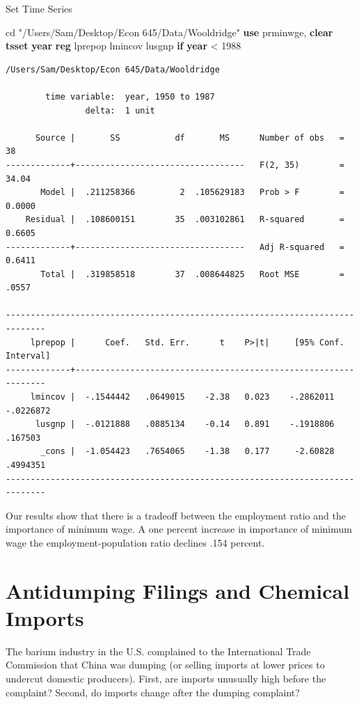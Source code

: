 \documentclass[
]{book}
\newenvironment{Shaded}{\begin{snugshade}}{\end{snugshade}}
\newcommand{\FunctionTok}[1]{\textcolor[rgb]{0.13,0.29,0.53}{\textbf{#1}}}
\newcommand{\KeywordTok}[1]{\textcolor[rgb]{0.13,0.29,0.53}{\textbf{#1}}}
\newcommand{\NormalTok}[1]{#1}
\newcommand{\StringTok}[1]{\textcolor[rgb]{0.31,0.60,0.02}{#1}}
\begin{document}
Set Time Series

\begin{Shaded}
\begin{Highlighting}[]
\NormalTok{cd }\StringTok{"/Users/Sam/Desktop/Econ 645/Data/Wooldridge"}
\KeywordTok{use}\NormalTok{ prminwge, }\KeywordTok{clear}
\KeywordTok{tsset} \FunctionTok{year}
\KeywordTok{reg}\NormalTok{ lprepop lmincov lusgnp }\KeywordTok{if} \FunctionTok{year}\NormalTok{ \textless{} 1988}
\end{Highlighting}
\end{Shaded}

\begin{verbatim}
/Users/Sam/Desktop/Econ 645/Data/Wooldridge

        time variable:  year, 1950 to 1987
                delta:  1 unit

      Source |       SS           df       MS      Number of obs   =        38
-------------+----------------------------------   F(2, 35)        =     34.04
       Model |  .211258366         2  .105629183   Prob > F        =    0.0000
    Residual |  .108600151        35  .003102861   R-squared       =    0.6605
-------------+----------------------------------   Adj R-squared   =    0.6411
       Total |  .319858518        37  .008644825   Root MSE        =     .0557

------------------------------------------------------------------------------
     lprepop |      Coef.   Std. Err.      t    P>|t|     [95% Conf. Interval]
-------------+----------------------------------------------------------------
     lmincov |  -.1544442   .0649015    -2.38   0.023    -.2862011   -.0226872
      lusgnp |  -.0121888   .0885134    -0.14   0.891    -.1918806     .167503
       _cons |  -1.054423   .7654065    -1.38   0.177     -2.60828    .4994351
------------------------------------------------------------------------------
\end{verbatim}

Our results show that there is a tradeoff between the employment ratio and
the importance of minimum wage. A one percent increase in importance of
minimum wage the employment-population ratio declines .154 percent.

\section{Antidumping Filings and Chemical Imports}\label{antidumping-filings-and-chemical-imports}

The barium industry in the U.S. complained to the International Trade Commission
that China was dumping (or selling imports at lower prices to undercut domestic producers).
First, are imports unusually high before the complaint? Second, do imports
change after the dumping complaint?
\end{document}

